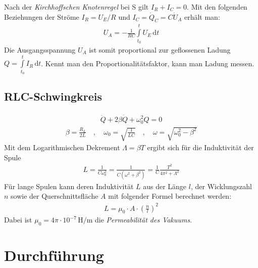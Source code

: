 \documentclass[12pt,a4paper,titlepage,headinclude,bibtotoc]{scrartcl}
\newcommand{\dif}{\ensuremath{\mathrm{d}}}
\begin{document}
Nach der \textit{Kirchhoffschen Knotenregel} bei S gilt $I_R+I_C=0$.
Mit den folgenden Beziehungen der Ströme $I_R=U_E/R$ und $I_C=\dot{Q}_C=C\dot{U}_A$ erhält man:
\begin{align}
	U_A=-\frac{1}{RC}\int \limits_{t_0}^t U_E \,\dif t
\end{align}
Die Ausgangsspannung $U_A$ ist somit proportional zur geflossenen Ladung $Q=\int \limits_{t_0}^t I_R \,\dif t$.
Kennt man den Proportionalitätsfaktor, kann man Ladung messen.

\subsection{RLC-Schwingkreis}

\begin{align}
	\ddot{Q}+2\beta\dot{Q}+\omega_0^2 Q=0
\end{align}
\begin{align*}
	\beta=\frac{R_L}{2L} \quad , \quad 
	\omega_0=\sqrt{\frac{1}{LC}} \quad , \quad
	\omega=\sqrt{\omega_0^2-\beta^2}
\end{align*}
Mit dem Logarithmischen Dekrement $\Lambda=\beta T$ ergibt sich für die Induktivität der Spule
\begin{align}
	L=\frac{1}{C\omega_0^2}=\frac{1}{C(\omega^2+\beta^2)}=\frac{1}{C}\frac{T^2}{4\pi^2+\Lambda^2}
	\label{eq:L}
\end{align}
Für lange Spulen kann deren Induktivität $L$ aus der Länge $l$, der Wicklungszahl $n$ sowie der Querschnittsfläche $A$ mit folgender Formel berechnet werden:
\begin{align}
	L=\mu_0 \cdot A \cdot \left(\frac{n}{l}\right)^2
	\label{eq:IndLangeSpule}
\end{align}
Dabei ist $\mu_0=4\pi\cdot 10^{-7}\, \si{\henry \per \meter}$ die \textit{Permeabilität des Vakuums}. 

\section{Durchführung}
\label{sec:durchfuehrung}
\end{document}
